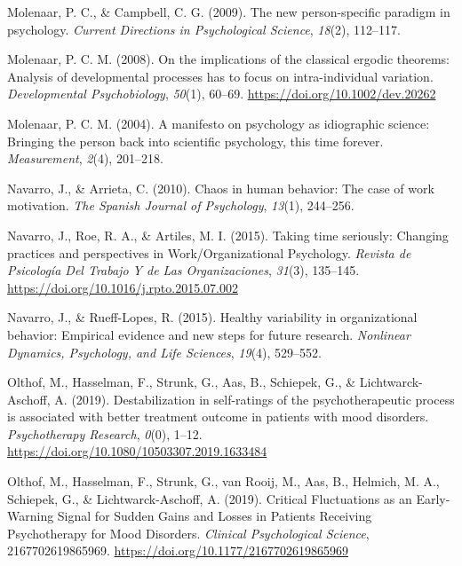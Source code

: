 \documentclass[
  british,
  man,floatsintext]{apa6}
\begin{document}
\leavevmode\hypertarget{ref-molenaarNewPersonspecificParadigm2009}{}%
Molenaar, P. C., \& Campbell, C. G. (2009). The new person-specific paradigm in psychology. \emph{Current Directions in Psychological Science}, \emph{18}(2), 112--117.

\leavevmode\hypertarget{ref-molenaarImplicationsClassicalErgodic2008}{}%
Molenaar, P. C. M. (2008). On the implications of the classical ergodic theorems: Analysis of developmental processes has to focus on intra-individual variation. \emph{Developmental Psychobiology}, \emph{50}(1), 60--69. \url{https://doi.org/10.1002/dev.20262}

\leavevmode\hypertarget{ref-molenaarManifestoPsychologyIdiographic2004}{}%
Molenaar, P. C. M. (2004). A manifesto on psychology as idiographic science: Bringing the person back into scientific psychology, this time forever. \emph{Measurement}, \emph{2}(4), 201--218.

\leavevmode\hypertarget{ref-navarroChaosHumanBehavior2010}{}%
Navarro, J., \& Arrieta, C. (2010). Chaos in human behavior: The case of work motivation. \emph{The Spanish Journal of Psychology}, \emph{13}(1), 244--256.

\leavevmode\hypertarget{ref-navarroTakingTimeSeriously2015}{}%
Navarro, J., Roe, R. A., \& Artiles, M. I. (2015). Taking time seriously: Changing practices and perspectives in Work/Organizational Psychology. \emph{Revista de Psicología Del Trabajo Y de Las Organizaciones}, \emph{31}(3), 135--145. \url{https://doi.org/10.1016/j.rpto.2015.07.002}

\leavevmode\hypertarget{ref-navarroHealthyVariabilityOrganizational2015}{}%
Navarro, J., \& Rueff-Lopes, R. (2015). Healthy variability in organizational behavior: Empirical evidence and new steps for future research. \emph{Nonlinear Dynamics, Psychology, and Life Sciences}, \emph{19}(4), 529--552.

\leavevmode\hypertarget{ref-olthofDestabilizationSelfratingsPsychotherapeutic2019}{}%
Olthof, M., Hasselman, F., Strunk, G., Aas, B., Schiepek, G., \& Lichtwarck-Aschoff, A. (2019). Destabilization in self-ratings of the psychotherapeutic process is associated with better treatment outcome in patients with mood disorders. \emph{Psychotherapy Research}, \emph{0}(0), 1--12. \url{https://doi.org/10.1080/10503307.2019.1633484}

\leavevmode\hypertarget{ref-olthofCriticalFluctuationsEarlyWarning2019}{}%
Olthof, M., Hasselman, F., Strunk, G., van Rooij, M., Aas, B., Helmich, M. A., Schiepek, G., \& Lichtwarck-Aschoff, A. (2019). Critical Fluctuations as an Early-Warning Signal for Sudden Gains and Losses in Patients Receiving Psychotherapy for Mood Disorders. \emph{Clinical Psychological Science}, 2167702619865969. \url{https://doi.org/10.1177/2167702619865969}
\end{document}
